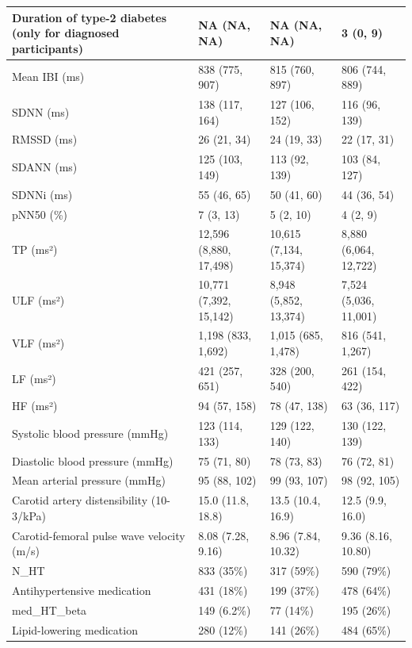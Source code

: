 \documentclass[
  a4paper,
  headsepline=true,
  open=any]{scrbook}
\begin{document}
\begin{table}
{\begin{tabular}{l|l|l|l}
\hline
Duration of type-2 diabetes (only for diagnosed participants) & NA (NA, NA) & NA (NA, NA) & 3 (0, 9)\\
\hline
Mean IBI (ms) & 838 (775, 907) & 815 (760, 897) & 806 (744, 889)\\
\hline
SDNN (ms) & 138 (117, 164) & 127 (106, 152) & 116 (96, 139)\\
\hline
RMSSD (ms) & 26 (21, 34) & 24 (19, 33) & 22 (17, 31)\\
\hline
SDANN (ms) & 125 (103, 149) & 113 (92, 139) & 103 (84, 127)\\
\hline
SDNNi (ms) & 55 (46, 65) & 50 (41, 60) & 44 (36, 54)\\
\hline
pNN50 (\%) & 7 (3, 13) & 5 (2, 10) & 4 (2, 9)\\
\hline
TP (ms²) & 12,596 (8,880, 17,498) & 10,615 (7,134, 15,374) & 8,880 (6,064, 12,722)\\
\hline
ULF (ms²) & 10,771 (7,392, 15,142) & 8,948 (5,852, 13,374) & 7,524 (5,036, 11,001)\\
\hline
VLF (ms²) & 1,198 (833, 1,692) & 1,015 (685, 1,478) & 816 (541, 1,267)\\
\hline
LF (ms²) & 421 (257, 651) & 328 (200, 540) & 261 (154, 422)\\
\hline
HF (ms²) & 94 (57, 158) & 78 (47, 138) & 63 (36, 117)\\
\hline
Systolic blood pressure (mmHg) & 123 (114, 133) & 129 (122, 140) & 130 (122, 139)\\
\hline
Diastolic blood pressure (mmHg) & 75 (71, 80) & 78 (73, 83) & 76 (72, 81)\\
\hline
Mean arterial pressure (mmHg) & 95 (88, 102) & 99 (93, 107) & 98 (92, 105)\\
\hline
Carotid artery distensibility (10-3/kPa) & 15.0 (11.8, 18.8) & 13.5 (10.4, 16.9) & 12.5 (9.9, 16.0)\\
\hline
Carotid-femoral pulse wave velocity (m/s) & 8.08 (7.28, 9.16) & 8.96 (7.84, 10.32) & 9.36 (8.16, 10.80)\\
\hline
N\_HT & 833 (35\%) & 317 (59\%) & 590 (79\%)\\
\hline
Antihypertensive medication & 431 (18\%) & 199 (37\%) & 478 (64\%)\\
\hline
med\_HT\_beta & 149 (6.2\%) & 77 (14\%) & 195 (26\%)\\
\hline
Lipid-lowering medication & 280 (12\%) & 141 (26\%) & 484 (65\%)\\
\hline
\end{tabular}}
\end{table}
\end{document}
